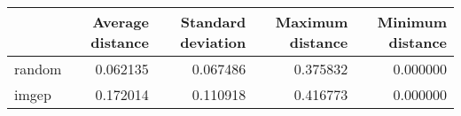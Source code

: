 \begin{tabular}{lrrrr}
\toprule
 & Average distance & Standard deviation & Maximum distance & Minimum distance \\
\midrule
random & 0.062135 & 0.067486 & 0.375832 & 0.000000 \\
imgep & 0.172014 & 0.110918 & 0.416773 & 0.000000 \\
\bottomrule
\end{tabular}
